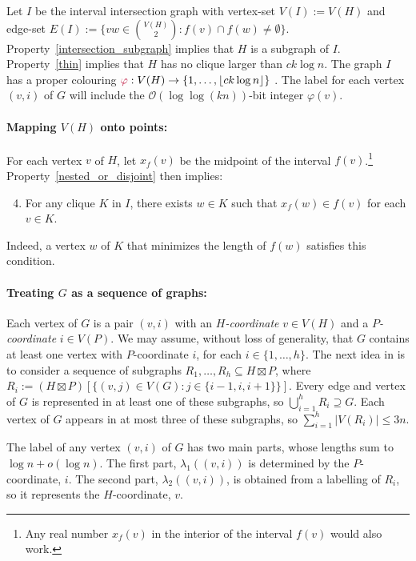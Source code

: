 \documentclass{patmorin}
\makeatletter
\renewcommand{\le}{\leqslant}
\newcommand{\defin}[1]{\emph{\textcolor{brightmaroon}{#1}}}
\def\mathcolor#1#{\@mathcolor{#1}}
\def\@mathcolor#1#2#3{%
  \protect\leavevmode
  \begingroup
    \color#1{#2}#3%
  \endgroup
}
\newcommand{\mathdefin}[1]{\mathcolor{brightmaroon}{#1}}
\newcommand{\Oh}{\calO}
\newcommand{\calO}{\mathcal{O}}
\makeatother
\begin{document}
  Let $I$ be the interval intersection graph with vertex-set $V(I):=V(H)$ and edge-set $E(I):=\{vw\in\binom{V(H)}{2}:f(v)\cap f(w)\neq\emptyset\}$.
  Property~\ref{intersection_subgraph} implies that $H$ is a subgraph of $I$. Property~\ref{thin} implies that $H$ has no clique larger than $ck\log n$.
  The graph $I$ has a proper colouring $\mathdefin{\varphi}:V(H)\to\{1,\ldots,\lfloor ck\log n\rfloor\}$ \cite{gilmore.hoffman:characterization}.
  The label for each vertex $(v,i)$ of $G$ will include the $\Oh(\log\log (kn))$-bit integer $\varphi(v)$.

  \paragraph{\boldmath Mapping $V(H)$ onto points:}
  For each vertex $v$ of $H$, let $x_f(v)$ be the midpoint of the interval $f(v)$.\footnote{Any real number $x_f(v)$ in the interior of the interval $f(v)$ would also work.}  Property~\ref{nested_or_disjoint} then implies:
  \begin{enumerate}\setcounter{enumi}{3}
      \item\label{clique_property} For any clique $K$ in $I$, there exists $w\in K$ such that $x_f(w)\in f(v)$ for each $v\in K$.
  \end{enumerate}
  Indeed, a vertex $w$ of $K$ that minimizes the length of $f(w)$ satisfies this condition.

  \paragraph{\boldmath Treating $G$ as a sequence of graphs:}
  Each vertex of $G$ is a pair $(v,i)$ with an \defin{$H$-coordinate} $v\in V(H)$ and a \defin{$P$-coordinate} $i\in V(P)$.
  We may assume, without loss of generality, that $G$ contains at least one vertex with $P$-coordinate $i$, for each $i\in\{1,\ldots,h\}$.
  The next idea in \cite{dujmovic.esperet.ea:adjacency} is to consider a sequence of subgraphs $R_1,\ldots,R_h\subseteq H\boxtimes P$, where $R_i:=(H\boxtimes P)[\{(v,j)\in V(G):j\in\{i-1,i,i+1\}\}]$.
  Every edge and vertex of $G$ is represented in at least one of these subgraphs, so $\bigcup_{i=1}^h R_i\supseteq G$.
  Each vertex of $G$ appears in at most three of these subgraphs, so $\sum_{i=1}^h |V(R_i)|\le 3n$.

  The label of any vertex $(v,i)$ of $G$ has two main parts, whose lengths sum to $\log n+o(\log n)$.
  The first part, $\lambda_1((v,i))$ is determined by the $P$-coordinate, $i$.
  The second part, $\lambda_2((v,i))$, is obtained from a labelling of $R_i$, so it represents the $H$-coordinate, $v$.
\end{document}

